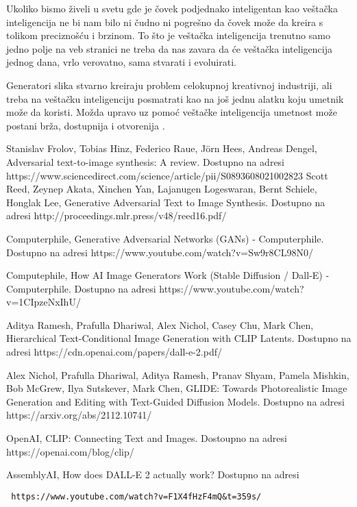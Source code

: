 \documentclass[12pt, letterpaper]{article}
\begin{document}
Ukoliko bismo živeli u svetu gde je čovek podjednako inteligentan kao veštačka inteligencija ne bi nam bilo ni čudno ni pogrešno da čovek može da kreira s tolikom preciznošću i brzinom. To što je veštačka inteligencija trenutno samo jedno polje na veb stranici ne treba da nas zavara da će veštačka inteligencija jednog dana, vrlo verovatno, sama stvarati i evoluirati.

Generatori slika stvarno kreiraju problem celokupnoj kreativnoj industriji, ali treba na veštačku inteligenciju posmatrati kao na još jednu alatku koju umetnik može da koristi. Možda upravo uz pomoć veštačke inteligencija umetnost može postani brža, dostupnija i otvorenija \cite{fear}.

\pagebreak
\begin{thebibliography}{10}

 Stanislav Frolov, Tobias Hinz, Federico Raue, Jörn Hees, Andreas Dengel, Adversarial text-to-image synthesis: A review. Dostupno na adresi https://www.sciencedirect.com/science/article/pii/S0893608021002823
 Scott Reed, Zeynep Akata, Xinchen Yan, Lajanugen Logeswaran, Bernt Schiele, Honglak Lee, Generative Adversarial Text to Image Synthesis. Dostupno na adresi http://proceedings.mlr.press/v48/reed16.pdf/

 Computerphile, Generative Adversarial Networks (GANs) - Computerphile. Dostupno na adresi https://www.youtube.com/watch?v=Sw9r8CL98N0/

 Computephile, How AI Image Generators Work (Stable Diffusion / Dall-E) - Computerphile. Dostupno na adresi https://www.youtube.com/watch?v=1CIpzeNxIhU/

 Aditya Ramesh, Prafulla Dhariwal, Alex Nichol, Casey Chu, Mark Chen, Hierarchical Text-Conditional
Image Generation with CLIP Latents. Dostupno na adresi https://cdn.openai.com/papers/dall-e-2.pdf/

 Alex Nichol, Prafulla Dhariwal, Aditya Ramesh, Pranav Shyam, Pamela Mishkin, Bob McGrew, Ilya Sutskever, Mark Chen, GLIDE: Towards Photorealistic Image Generation and Editing with Text-Guided Diffusion Models. Dostupno na adresi https://arxiv.org/abs/2112.10741/

 OpenAI, CLIP: Connecting
Text and Images. Dostoupno na adresi https://openai.com/blog/clip/

 AssemblyAI, How does DALL-E 2 actually work? Dostupno na adresi\begin{verbatim} https://www.youtube.com/watch?v=F1X4fHzF4mQ&t=359s/


\end{verbatim}
\end{thebibliography}
\end{document}
